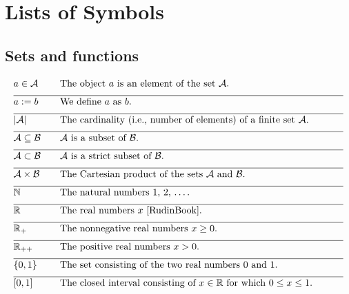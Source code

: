 
\section*{Lists of Symbols}



\vspace*{-2mm}
\subsection*{Sets and \Glspl{function}} 

\begin{align} 
	&a \in \mathcal{A} & \quad & \parbox{.85\textwidth}{The object $a$ is an element of the set $\mathcal{A}$.} \nonumber \\[2mm] \hline \nonumber\\[-5mm]
	&a \defeq b & \quad & \mbox{We define $a$ as $b$. }\nonumber \\[2mm] \hline \nonumber\\[-5mm] %
	&|\mathcal{A}| & \quad & \mbox{The cardinality (i.e., number of elements) of a finite set $\mathcal{A}$.}\nonumber \\[2mm] \hline \nonumber\\[-5mm]
	&\mathcal{A} \subseteq \mathcal{B}& \quad & \mbox{$\mathcal{A}$ is a subset of $\mathcal{B}$.}\nonumber \\[2mm] \hline \nonumber\\[-5mm]
	&\mathcal{A} \subset \mathcal{B}& \quad & \mbox{$\mathcal{A}$ is a strict subset of $\mathcal{B}$.} \nonumber \\[2mm] \hline \nonumber\\[-5mm]
	&\mathcal{A} \times \mathcal{B} & \quad & \mbox{The Cartesian product of the sets $\mathcal{A}$ and $\mathcal{B}$.} \nonumber \\[2mm] \hline \nonumber\\[-5mm]
	&\mathbb{N} & \quad & \mbox{The natural numbers $1, \,2, \,\dots$.}\nonumber \\[2mm] \hline \nonumber\\[-5mm]
	&\mathbb{R}  &\quad &\mbox{The real numbers $x$ \cite{RudinBook}.} \nonumber \\[2mm] \hline \nonumber\\[-5mm]
	&\mathbb{R}_{+}  &\quad &\mbox{The nonnegative real numbers $x\geq0$.}\nonumber \\[2mm] \hline \nonumber\\[-5mm]
	&\mathbb{R}_{++}  &\quad &\mbox{The positive real numbers $x> 0$.} \nonumber \\[2mm] \hline \nonumber\\[-5mm]
	&\{0,1\}& \quad & \mbox{The set consisting of the two real numbers $0$ and $1$.} \nonumber \\[2mm] \hline \nonumber\\[-5mm]
	&[0,1] &\quad &\mbox{The closed interval consisting of $x \in \mathbb{R}$ for which $0 \leq x \leq 1$. }\nonumber 
\end{align} 

